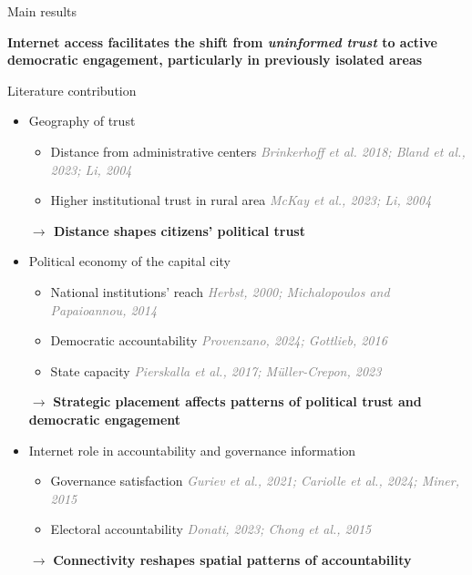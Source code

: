 \documentclass[10pt]{beamer}
\begin{document}
\begin{frame}{Main results}
\begin{enumerate}
    \end{enumerate}
    \vspace{0.5em}
    \begin{center}
        \textbf{Internet access facilitates the shift from \textit{uninformed trust} to active democratic engagement, particularly in previously isolated areas}
    \end{center}
\end{frame}


\begin{frame}{Literature contribution}

    \begin{itemize}\setlength\itemsep{1em}
        \item Geography of trust \vfill
        \begin{itemize}
            \item Distance from administrative centers \textcolor{gray}{\textit{Brinkerhoff et al. 2018; Bland et al., 2023; Li, 2004}} \vfill
            \item Higher institutional trust in rural area \textcolor{gray}{\textit{McKay et al., 2023; Li, 2004}} \vfill
        \end{itemize}
        \textcolor{rougeprez}{\textbf{$\rightarrow$ Distance shapes citizens’ political trust}}\vfill
        \item Political economy of the capital city \vfill
        \begin{itemize}
            \item National institutions’ reach \textcolor{gray}{\textit{Herbst, 2000; Michalopoulos and Papaioannou, 2014}} \vfill
            \item Democratic accountability \textcolor{gray}{\textit{Provenzano, 2024; Gottlieb, 2016}} \vfill
            \item State capacity \textcolor{gray}{\textit{Pierskalla et al., 2017; Müller-Crepon, 2023}}  \vfill
        \end{itemize}
        \textcolor{rougeprez}{$\rightarrow$ \textbf{Strategic placement affects patterns of political trust and democratic engagement}}\vfill    

        \item Internet role in accountability and governance information\vfill
        \begin{itemize}
            \item Governance satisfaction \textcolor{gray}{\textit{Guriev et al., 2021; Cariolle et al., 2024; Miner, 2015}} \vfill
            \item Electoral accountability \textcolor{gray}{\textit{Donati, 2023; Chong et al., 2015}} \vfill
        \end{itemize}
        \textcolor{rougeprez}{$\rightarrow$ \textbf{Connectivity reshapes spatial patterns of accountability}}\vfill
    \end{itemize}
    \end{frame}
    
\end{document}

